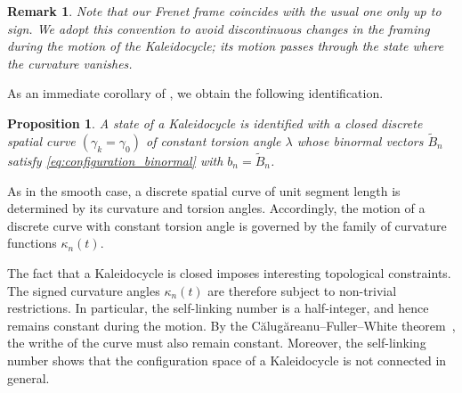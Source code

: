 \documentclass[10pt,leqno]{amsart}
\newtheorem{prop}[theorem]{Proposition}
\newtheorem{remark}[theorem]{Remark}
\numberwithin{equation}{section}
\begin{document}
\begin{remark}
Note that our Frenet frame coincides with the usual one only up to sign.
We adopt this convention to avoid discontinuous changes in the framing during the motion of the Kaleidocycle; its motion passes through the state where the curvature vanishes.
\end{remark}

As an immediate corollary of , we obtain the following identification.
\begin{prop}\label{prop:identification}
A state of a Kaleidocycle is identified with a closed discrete spatial curve
$(\gamma_k=\gamma_0)$ of constant torsion angle $\lambda$ whose binormal vectors $\widetilde{B}_n$ satisfy
\eqref{eq:configuration_binormal} with $b_n=\widetilde{B}_n$.
\end{prop}

As in the smooth case, a discrete spatial curve of unit segment length is determined by its curvature and torsion angles.
Accordingly, the motion of a discrete curve with constant torsion angle is governed by the family of curvature functions $\kappa_n(t)$.

The fact that a Kaleidocycle is closed imposes interesting topological constraints.
The signed curvature angles $\kappa_n(t)$ are therefore subject to non-trivial restrictions.
In particular, the self-linking number is a half-integer, and hence remains constant during the motion.
By the C\u{a}lug\u{a}reanu--Fuller--White theorem~\cite{banchoff1975behavior}, the writhe of the curve must also remain constant.
Moreover, the self-linking number shows that the configuration space of a Kaleidocycle is not connected in general.
\end{document}

